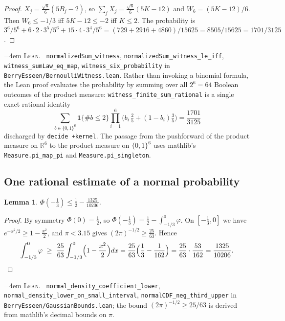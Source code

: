 \documentclass[10pt,a4paper]{article}
\theoremstyle{plain}
\newtheorem{lemma}[theorem]{Lemma}
\theoremstyle{definition}
\newcommand{\R}{\mathbb{R}}
\newcommand{\lean}[1]{\texttt{#1}}
\newcommand{\file}[1]{\texttt{#1}}
\newenvironment{leanref}%
  {\par\addvspace{3pt}\begingroup\sloppy\emergencystretch=4em
   \noindent\footnotesize\textsc{Lean.}\ \ignorespaces}%
  {\par\endgroup\addvspace{3pt}}
\begin{document}
\begin{proof}
$X_j=\frac{\sqrt6}{6}(5B_j-2)$, so $\sum_j X_j=\frac{\sqrt6}{6}(5K-12)$ and
$W_6=(5K-12)/6$. Then $W_6\le-1/3$ iff $5K-12\le-2$ iff $K\le2$. The
probability is $3^6/5^6 + 6\cdot2\cdot3^5/5^6 + 15\cdot4\cdot3^4/5^6
=(729+2916+4860)/15625=8505/15625=1701/3125$.
\end{proof}

\begin{leanref}
\lean{normalizedSum\_witness}, \lean{normalizedSum\_witness\_le\_iff},
\lean{witness\_sumLaw\_eq\_map}, \lean{witness\_six\_probability} in
\file{BerryEsseen/BernoulliWitness.lean}. Rather than invoking a binomial
formula, the Lean proof evaluates the probability by summing over all
$2^6=64$ Boolean outcomes of the product measure:
\lean{witness\_finite\_sum\_rational} is a single exact rational identity
\[
  \sum_{b\in\{0,1\}^{6}} \mathbf 1\{\#b\le2\}\prod_{i=1}^{6}
  \bigl(b_i\,\tfrac25+(1-b_i)\tfrac35\bigr) = \frac{1701}{3125}
\]
discharged by \lean{decide +kernel}. The passage from the pushforward of the
product measure on $\R^6$ to the product measure on $\{0,1\}^6$ uses
mathlib's \lean{Measure.pi\_map\_pi} and \lean{Measure.pi\_singleton}.
\end{leanref}

\subsection{One rational estimate of a normal probability}

\begin{lemma}\label{lem:normal-third}
$\displaystyle \Phi(-\tfrac13) \le \frac12 - \frac{1325}{10206}$.
\end{lemma}

\begin{proof}
By symmetry $\Phi(0)=\tfrac12$, so
$\Phi(-\tfrac13)=\tfrac12-\int_{-1/3}^{0}\varphi$. On $[-\tfrac13,0]$ we have
$e^{-x^2/2}\ge1-\tfrac{x^2}{2}$, and $\pi<3.15$ gives
$(2\pi)^{-1/2}\ge\tfrac{25}{63}$. Hence
\[
  \int_{-1/3}^{0}\varphi
  \ \ge\ \frac{25}{63}\int_{-1/3}^{0}\Bigl(1-\frac{x^2}{2}\Bigr)dx
  = \frac{25}{63}\Bigl(\frac13-\frac{1}{162}\Bigr)
  = \frac{25}{63}\cdot\frac{53}{162}
  = \frac{1325}{10206}. \qedhere
\]
\end{proof}

\begin{leanref}
\lean{normal\_density\_coefficient\_lower},
\lean{normal\_density\_lower\_on\_small\_interval},
\lean{normalCDF\_neg\_third\_upper} in \file{BerryEsseen/GaussianBounds.lean};
the bound $(2\pi)^{-1/2}\ge25/63$ is derived from mathlib's decimal bounds on
$\pi$.
\end{leanref}
\end{document}
